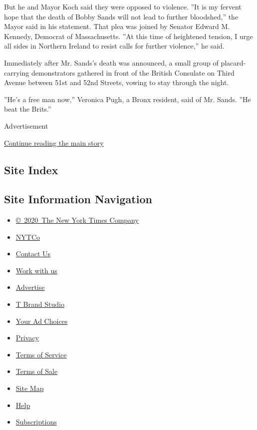 But he and Mayor Koch said they were opposed to violence. ''It is my
fervent hope that the death of Bobby Sands will not lead to further
bloodshed,'' the Mayor said in his statement. That plea was joined by
Senator Edward M. Kennedy, Democrat of Massachusetts. ''At this time of
heightened tension, I urge all sides in Northern Ireland to resist calls
for further violence,'' he said.

Immediately after Mr. Sands's death was announced, a small group of
placard-carrying demonstrators gathered in front of the British
Consulate on Third Avenue between 51st and 52nd Streets, vowing to stay
through the night.

''He's a free man now,'' Veronica Pugh, a Bronx resident, said of Mr.
Sands. ''He beat the Brits.''

Advertisement

\protect\hyperlink{after-bottom}{Continue reading the main story}

\hypertarget{site-index}{%
\subsection{Site Index}\label{site-index}}

\hypertarget{site-information-navigation}{%
\subsection{Site Information
Navigation}\label{site-information-navigation}}

\begin{itemize}
\tightlist
\item
  \href{https://help.nytimes.com/hc/en-us/articles/115014792127-Copyright-notice}{©~2020~The
  New York Times Company}
\end{itemize}

\begin{itemize}
\tightlist
\item
  \href{https://www.nytco.com/}{NYTCo}
\item
  \href{https://help.nytimes.com/hc/en-us/articles/115015385887-Contact-Us}{Contact
  Us}
\item
  \href{https://www.nytco.com/careers/}{Work with us}
\item
  \href{https://nytmediakit.com/}{Advertise}
\item
  \href{http://www.tbrandstudio.com/}{T Brand Studio}
\item
  \href{https://www.nytimes.com/privacy/cookie-policy\#how-do-i-manage-trackers}{Your
  Ad Choices}
\item
  \href{https://www.nytimes.com/privacy}{Privacy}
\item
  \href{https://help.nytimes.com/hc/en-us/articles/115014893428-Terms-of-service}{Terms
  of Service}
\item
  \href{https://help.nytimes.com/hc/en-us/articles/115014893968-Terms-of-sale}{Terms
  of Sale}
\item
  \href{https://spiderbites.nytimes.com}{Site Map}
\item
  \href{https://help.nytimes.com/hc/en-us}{Help}
\item
  \href{https://www.nytimes.com/subscription?campaignId=37WXW}{Subscriptions}
\end{itemize}
